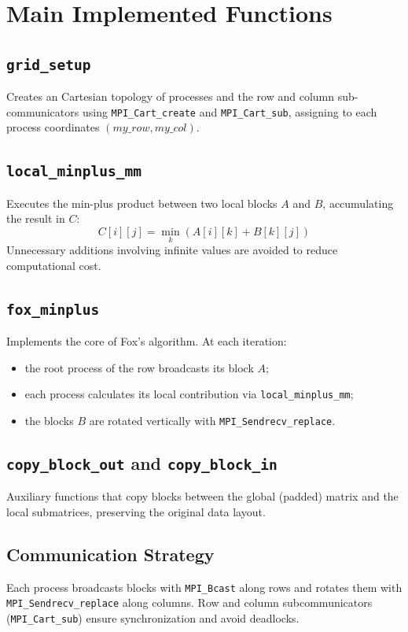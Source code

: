\documentclass[10pt,a4paper]{article}
\begin{document}
\section{Main Implemented Functions}

\subsection{\texttt{grid\_setup}}
Creates an Cartesian topology of processes and the row and column sub-communicators using \texttt{MPI\_Cart\_create} and \texttt{MPI\_Cart\_sub}, 
assigning to each process coordinates \((my\_row, my\_col)\).

\subsection{\texttt{local\_minplus\_mm}}
Executes the min-plus product between two local blocks \(A\) and \(B\), accumulating the result in \(C\):
\[
C[i][j] = \min_k(A[i][k] + B[k][j])
\]
Unnecessary additions involving infinite values are avoided to reduce computational cost.

\subsection{\texttt{fox\_minplus}}
Implements the core of Fox's algorithm.  
At each iteration:
\begin{itemize}
  \item the root process of the row broadcasts its block \(A\);
  \item each process calculates its local contribution via \texttt{local\_minplus\_mm};
  \item the blocks \(B\) are rotated vertically with \texttt{MPI\_Sendrecv\_replace}.
\end{itemize}

\subsection{\texttt{copy\_block\_out} and \texttt{copy\_block\_in}}
Auxiliary functions that copy blocks between the global (padded) matrix and the local submatrices, preserving the original data layout.

\subsection*{Communication Strategy}
Each process broadcasts blocks with \texttt{MPI\_Bcast} along rows and rotates them with \texttt{MPI\_Sendrecv\_replace} along columns.  
Row and column subcommunicators (\texttt{MPI\_Cart\_sub}) ensure synchronization and avoid deadlocks.
\end{document}
